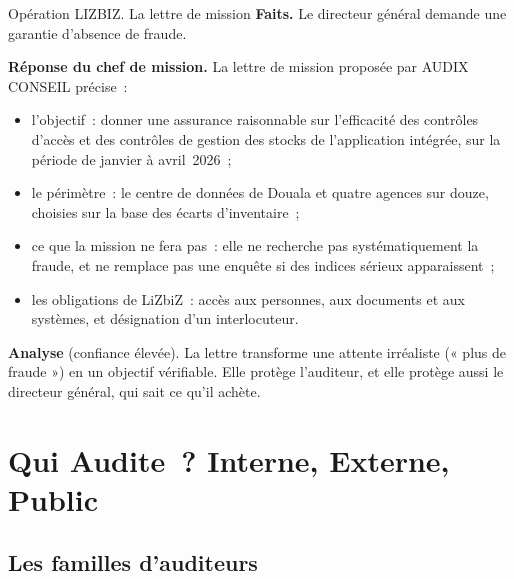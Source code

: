 \begin{boxscenario}{Opération LIZBIZ. La lettre de mission}
\textbf{Faits.} Le directeur général demande une garantie d'absence de
fraude.

\medskip
\textbf{Réponse du chef de mission.} La lettre de mission proposée par
AUDIX CONSEIL précise~:
\begin{itemize}
    \item l'objectif~: donner une assurance raisonnable sur l'efficacité des
          contrôles d'accès et des contrôles de gestion des stocks de
          l'application intégrée, sur la période de janvier à avril~2026~;
    \item le périmètre~: le centre de données de Douala et quatre agences
          sur douze, choisies sur la base des écarts d'inventaire~;
    \item ce que la mission ne fera pas~: elle ne recherche pas
          systématiquement la fraude, et ne remplace pas une enquête si des
          indices sérieux apparaissent~;
    \item les obligations de LiZbiZ~: accès aux personnes, aux documents et
          aux systèmes, et désignation d'un interlocuteur.
\end{itemize}

\textbf{Analyse} (confiance élevée). La lettre transforme une attente
irréaliste (« plus de fraude ») en un objectif vérifiable. Elle protège
l'auditeur, et elle protège aussi le directeur général, qui sait ce qu'il
achète.
\end{boxscenario}

\section{Qui Audite~? Interne, Externe, Public}
\label{sec:c01-acteurs}

\subsection{Les familles d'auditeurs}

